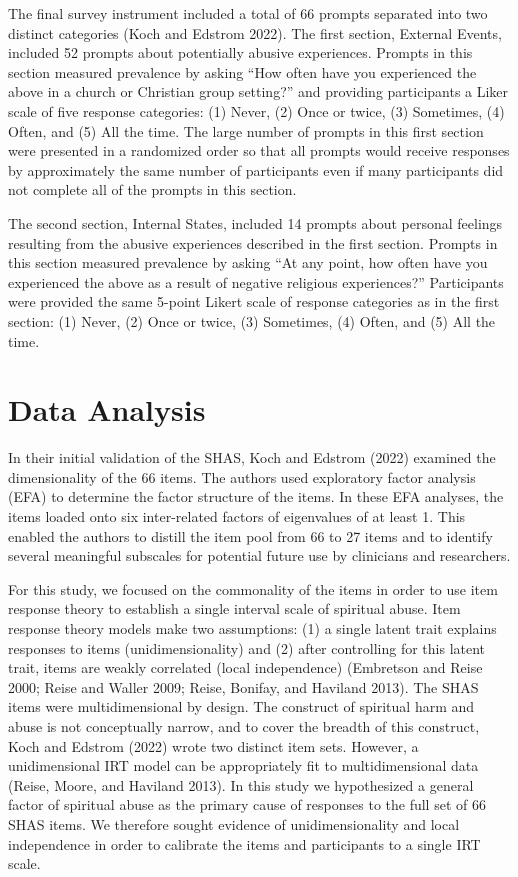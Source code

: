 \documentclass[
  letterpaper,
]{article}
\begin{document}
The final survey instrument included a total of 66 prompts separated
into two distinct categories (Koch and Edstrom 2022). The first section,
External Events, included 52 prompts about potentially abusive
experiences. Prompts in this section measured prevalence by asking ``How
often have you experienced the above in a church or Christian group
setting?'' and providing participants a Liker scale of five response
categories: (1) Never, (2) Once or twice, (3) Sometimes, (4) Often, and
(5) All the time. The large number of prompts in this first section were
presented in a randomized order so that all prompts would receive
responses by approximately the same number of participants even if many
participants did not complete all of the prompts in this section.

The second section, Internal States, included 14 prompts about personal
feelings resulting from the abusive experiences described in the first
section. Prompts in this section measured prevalence by asking ``At any
point, how often have you experienced the above as a result of negative
religious experiences?'' Participants were provided the same 5-point
Likert scale of response categories as in the first section: (1) Never,
(2) Once or twice, (3) Sometimes, (4) Often, and (5) All the time.

\hypertarget{data-analysis}{%
\section*{Data Analysis}\label{data-analysis}}

In their initial validation of the SHAS, Koch and Edstrom (2022)
examined the dimensionality of the 66 items. The authors used
exploratory factor analysis (EFA) to determine the factor structure of
the items. In these EFA analyses, the items loaded onto six
inter-related factors of eigenvalues of at least 1. This enabled the
authors to distill the item pool from 66 to 27 items and to identify
several meaningful subscales for potential future use by clinicians and
researchers.

For this study, we focused on the commonality of the items in order to
use item response theory to establish a single interval scale of
spiritual abuse. Item response theory models make two assumptions: (1) a
single latent trait explains responses to items (unidimensionality) and
(2) after controlling for this latent trait, items are weakly correlated
(local independence) (Embretson and Reise 2000; Reise and Waller 2009;
Reise, Bonifay, and Haviland 2013). The SHAS items were multidimensional
by design. The construct of spiritual harm and abuse is not conceptually
narrow, and to cover the breadth of this construct, Koch and Edstrom
(2022) wrote two distinct item sets. However, a unidimensional IRT model
can be appropriately fit to multidimensional data (Reise, Moore, and
Haviland 2013). In this study we hypothesized a general factor of
spiritual abuse as the primary cause of responses to the full set of 66
SHAS items. We therefore sought evidence of unidimensionality and local
independence in order to calibrate the items and participants to a
single IRT scale.
\end{document}
